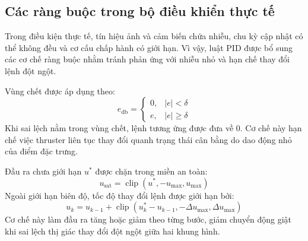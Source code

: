 \documentclass[../DoAn.tex]{subfiles}
\begin{document}
\subsection{Các ràng buộc trong bộ điều khiển thực tế}

Trong điều kiện thực tế, tín hiệu ảnh và cảm biến chứa nhiễu, chu kỳ cập nhật có thể không đều và cơ cấu chấp hành có giới hạn. Vì vậy, luật PID được bổ sung các cơ chế ràng buộc nhằm tránh phản ứng với nhiễu nhỏ và hạn chế thay đổi lệnh đột ngột.

Vùng chết được áp dụng theo:
\[
e_{\mathrm{db}} =
\begin{cases}
0, & |e| < \delta \\
e, & |e| \geq \delta
\end{cases}
\]
Khi sai lệch nằm trong vùng chết, lệnh tương ứng được đưa về 0. Cơ chế này hạn chế việc thruster liên tục thay đổi quanh trạng thái cân bằng do dao động nhỏ của điểm đặc trưng.

Đầu ra chưa giới hạn $u^{*}$ được chặn trong miền an toàn:
\[
u_{\mathrm{sat}} = \operatorname{clip}\left(u^{*}, -u_{\max}, u_{\max}\right)
\]
Ngoài giới hạn biên độ, tốc độ thay đổi lệnh được giới hạn bởi:
\[
u_k = u_{k-1} + \operatorname{clip}\left(u_k^{*} - u_{k-1}, -\Delta u_{\max}, \Delta u_{\max}\right)
\]
Cơ chế này làm đầu ra tăng hoặc giảm theo từng bước, giảm chuyển động giật khi sai lệch thị giác thay đổi đột ngột giữa hai khung hình.
\end{document}
